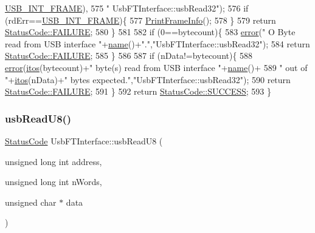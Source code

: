 \begin{DoxyCode}
      \hyperlink{LALUsbML_8h_a68260f9cf3649507d12904cfa1592c11afd1c409187b1dfd3d66887a5e07e7ed3}{USB\_INT\_FRAME}),
575             \textcolor{stringliteral}{" UsbFTInterface::usbRead32"});
576     \textcolor{keywordflow}{if} (rdErr==\hyperlink{LALUsbML_8h_a68260f9cf3649507d12904cfa1592c11afd1c409187b1dfd3d66887a5e07e7ed3}{USB\_INT\_FRAME})\{
577       \hyperlink{LALUsbML_8h_ab3398c17204ba7fb4b47eb9bbf4ba94e}{PrintFrameInfo}();
578     \} 
579     \textcolor{keywordflow}{return} \hyperlink{classStatusCode_a6f565cbeadc76d14c72f047e5e85eb4ba3da73d4c469762eb9d3c960368252b26}{StatusCode::FAILURE};
580   \}
581   
582   \textcolor{keywordflow}{if} (0==bytecount)\{
583     \hyperlink{classObject_a204a95f57818c0f811933917a30eff45}{error}(\textcolor{stringliteral}{" O Byte read from USB interface "}+\hyperlink{classObject_a300f4c05dd468c7bb8b3c968868443c1}{name}()+\textcolor{stringliteral}{"."},\textcolor{stringliteral}{"UsbFTInterface::usbRead32"});
584     \textcolor{keywordflow}{return} \hyperlink{classStatusCode_a6f565cbeadc76d14c72f047e5e85eb4ba3da73d4c469762eb9d3c960368252b26}{StatusCode::FAILURE};
585   \}
586 
587   \textcolor{keywordflow}{if} (nData!=bytecount)\{
588     \hyperlink{classObject_a204a95f57818c0f811933917a30eff45}{error}(\hyperlink{Tools_8h_af330027dbdafb9a30768b3613c553e60}{itos}(bytecount)+\textcolor{stringliteral}{" byte(s) read from USB interface "}+\hyperlink{classObject_a300f4c05dd468c7bb8b3c968868443c1}{name}()+
589             \textcolor{stringliteral}{" out of "}+\hyperlink{Tools_8h_af330027dbdafb9a30768b3613c553e60}{itos}(nData)+\textcolor{stringliteral}{" bytes expected."},\textcolor{stringliteral}{"UsbFTInterface::usbRead32"});
590     \textcolor{keywordflow}{return} \hyperlink{classStatusCode_a6f565cbeadc76d14c72f047e5e85eb4ba3da73d4c469762eb9d3c960368252b26}{StatusCode::FAILURE};    
591   \}
592   \textcolor{keywordflow}{return} \hyperlink{classStatusCode_a6f565cbeadc76d14c72f047e5e85eb4badd0da38d3ba0d922efd1f4619bc37ad8}{StatusCode::SUCCESS};
593 \}
\end{DoxyCode}
\mbox{\label{classUsbFTInterface_ab0803dd4c3ce3bf26dff4f4145b34546}} 
\subsubsection{\texorpdfstring{usb\+Read\+U8()}{usbReadU8()}}
{\footnotesize\ttfamily \hyperlink{classStatusCode}{Status\+Code} Usb\+F\+T\+Interface\+::usb\+Read\+U8 (\begin{DoxyParamCaption}\item[{unsigned long int}]{address,  }\item[{unsigned long int}]{n\+Words,  }\item[{unsigned char $\ast$}]{data }\end{DoxyParamCaption})}

